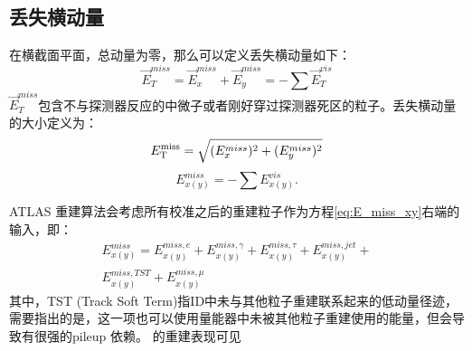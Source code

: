 \subsection{丢失横动量}\label{subsec:met_reco}
在横截面平面，总动量为零，那么可以定义丢失横动量如下：
\begin{equation}
\overrightarrow{E}_{T}^{miss}=\overrightarrow{E}_{x}^{miss}+\overrightarrow{E}_{y}^{miss}=-\sum \overrightarrow{E}_{T}^{vis}
\end{equation}
$\overrightarrow{E}_{T}^{miss}$包含不与探测器反应的中微子或者刚好穿过探测器死区的粒子。丢失横动量的大小定义为：
\begin{equation}
 E_{\text{T}}^{\text{miss}}=\sqrt{(E_x^{miss})^2+(E_y^{miss})^2}
\end{equation}
\begin{equation}\label{eq:E_miss_xy}
  E_{x(y)}^{miss}=-\sum E_{x(y)}^{vis}.
\end{equation}

ATLAS \met 重建算法\cite{Aaboud:2018tkc}会考虑所有校准之后的重建粒子作为方程\ref{eq:E_miss_xy}右端的输入，即：
\begin{equation}
\begin{aligned}
 E_{x(y)}^{miss}=E_{x(y)}^{miss,e}+E_{x(y)}^{miss,\gamma}+E_{x(y)}^{miss,\tau}+E_{x(y)}^{miss,jet}+\\
 E_{x(y)}^{miss,TST}+E_{x(y)}^{miss,\mu}
 \end{aligned}
\end{equation}
其中，TST (Track Soft Term)指ID中未与其他粒子重建联系起来的低动量径迹，需要指出的是，这一项也可以使用量能器中未被其他粒子重建使用的能量，但会导致\met 有很强的pileup 依赖。
\met 的重建表现可见\cite{Aaboud:2018tkc}

